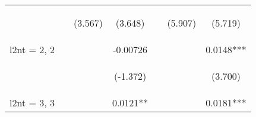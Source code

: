 \documentclass{standalone}
\begin{document}
\begin{tabular}{lcccccc}
    \vspace{4pt}     & \begin{footnotesize}\end{footnotesize}          & \begin{footnotesize}(3.567)\end{footnotesize}   & \begin{footnotesize}(3.648)\end{footnotesize}   & \begin{footnotesize}\end{footnotesize}         & \begin{footnotesize}(5.907)\end{footnotesize}  & \begin{footnotesize}(5.719)\end{footnotesize}  \\
    l2nt = 2, 2      &                                                 &                                                 & -0.00726                                        &                                                &                                                & 0.0148***                                      \\
    \vspace{4pt}     & \begin{footnotesize}\end{footnotesize}          & \begin{footnotesize}\end{footnotesize}          & \begin{footnotesize}(-1.372)\end{footnotesize}  & \begin{footnotesize}\end{footnotesize}         & \begin{footnotesize}\end{footnotesize}         & \begin{footnotesize}(3.700)\end{footnotesize}  \\
    l2nt = 3, 3      &                                                 &                                                 & 0.0121**                                        &                                                &                                                & 0.0181***                                      \\

\end{tabular}
\end{document}
